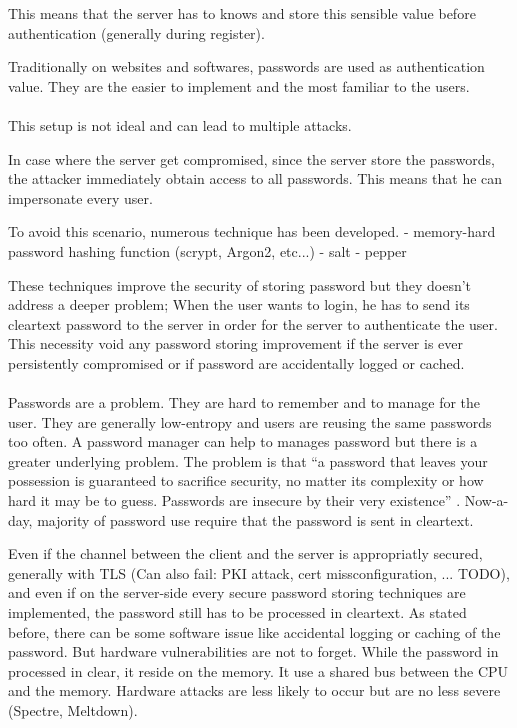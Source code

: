 \documentclass[../report.tex]{subfiles}
\begin{document}
This means that the server has to knows and store this sensible value before authentication (generally during register).

Traditionally on websites and softwares, passwords are used as authentication value. They are the easier to implement and the most familiar to the users.



\paragraph{}
This setup is not ideal and can lead to multiple attacks.

In case where the server get compromised, since the server store the passwords, the attacker immediately obtain access to all passwords. This means that he can impersonate every user.

To avoid this scenario, numerous technique has been developed.
- memory-hard password hashing function (scrypt, Argon2, etc...)
- salt
- pepper

These techniques improve the security of storing password but they doesn't address a deeper problem;
When the user wants to login, he has to send its cleartext password to the server in order for the server to authenticate the user. This necessity void any password storing improvement if the server is ever persistently compromised or if password are accidentally logged or cached.


\paragraph{}
Passwords are a problem. They are hard to remember and to manage for the user. They are generally low-entropy and users are reusing the same passwords too often. A password manager can help to manages password but there is a greater underlying problem.
The problem is that ``a password that leaves your possession is guaranteed to sacrifice security, no matter its complexity or how hard it may be to guess. Passwords are insecure by their very existence'' \cite{PAKE_Cloudflare_blog}. %
Now-a-day, majority of password use require that the password is sent in cleartext.

Even if the channel between the client and the server is appropriatly secured, generally with TLS (Can also fail: PKI attack, cert missconfiguration, ... TODO), and even if on the server-side every secure password storing techniques are implemented, the password still has to be processed in cleartext.
As stated before, there can be some software issue like accidental logging or caching of the password. But hardware vulnerabilities are not to forget. While the password in processed in clear, it reside on the memory. It use a shared bus between the CPU and the memory. Hardware attacks are less likely to occur but are no less severe (Spectre, Meltdown).
\end{document}
